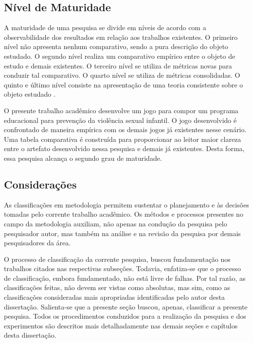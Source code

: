 \subsection{Nível de Maturidade}\label{sub:Maturidade}

A maturidade de uma pesquisa se divide em níveis de acordo com a observabilidade dos resultados em relação aos trabalhos existentes. O primeiro nível não apresenta nenhum comparativo, sendo a pura descrição do objeto estudado. O segundo nível realiza um comparativo empírico entre o objeto de estudo e demais existentes. O terceiro nível se utiliza de métricas novas para conduzir tal comparativo. O quarto nível se utiliza de métricas consolidadas. O quinto e último nível consiste na apresentação de uma teoria consistente sobre o objeto estudado \cite{wazlawick2014metodologia}.%

O presente trabalho acadêmico desenvolve um jogo para compor um programa educacional para prevenção da violência sexual infantil. O jogo desenvolvido é confrontado de maneira empírica com os demais jogos já existentes nesse cenário. Uma tabela comparativa é construída para proporcionar ao leitor maior clareza entre o artefato desenvolvido nessa pesquisa e demais já existentes. Desta forma, essa pesquisa alcança o segundo grau de maturidade. 


\subsection{Considerações}\label{sub:Considerar}

As classificações em metodologia permitem sustentar o planejamento e às decisões tomadas pelo corrente trabalho acadêmico. Os métodos e processos presentes no campo da metodologia auxiliam, não apenas na condução da pesquisa pelo pesquisador autor, mas também na análise e na revisão da pesquisa por demais pesquisadores da área.

O processo de classificação da corrente pesquisa, buscou fundamentação nos trabalhos citados nas respectivas subseções. Todavia, enfatiza-se que o processo de classificação, embora fundamentado, não está livre de falhas. Por tal razão, as classificações feitas, não devem ser vistas como absolutas, mas sim, como as classificações consideradas mais apropriadas identificadas pelo autor desta dissertação. Salienta-se que a presente seção buscou, apenas, classificar a presente pesquisa. Todos os procedimentos conduzidos para a realização da pesquisa e dos experimentos são descritos mais detalhadamente nas demais seções e capítulos desta dissertação.


